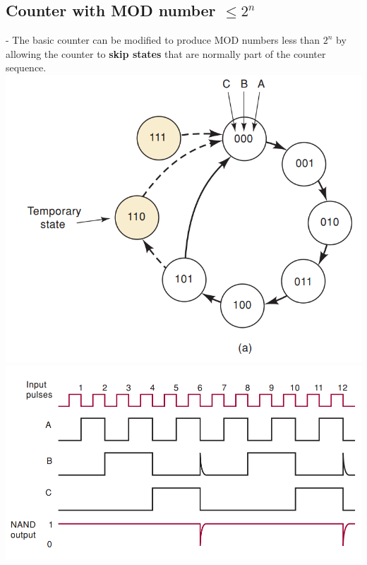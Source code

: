 \documentclass[12pt]{article}
\begin{document}
\subsection{Counter with MOD number $\le 2^{n}$}
- The basic counter can be modified to produce MOD numbers less than $2^{n}$ by allowing the counter to \textbf{skip states} that are normally part of the counter sequence. \\
\includegraphics[scale = 0.6]{hinh41}
\bigbreak
\includegraphics[scale = 0.6]{hinh42}
\bigbreak
\end{document}
